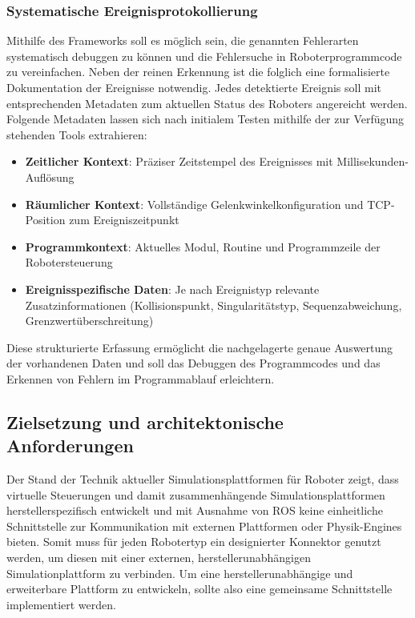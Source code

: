 \subsubsection{Systematische Ereignisprotokollierung}

Mithilfe des Frameworks soll es möglich sein, die genannten Fehlerarten
systematisch debuggen zu können und die Fehlersuche in Roboterprogrammcode zu
vereinfachen. Neben der reinen Erkennung ist die folglich eine formalisierte
Dokumentation der Ereignisse notwendig. Jedes detektierte Ereignis soll mit
entsprechenden Metadaten zum aktuellen Status des Roboters angereicht werden.
Folgende Metadaten lassen sich nach initialem Testen mithilfe der zur Verfügung
stehenden Tools extrahieren:

\begin{itemize}
  \item \textbf{Zeitlicher Kontext}: Präziser Zeitstempel des
    Ereignisses mit Millisekunden-Auflösung
  \item \textbf{Räumlicher Kontext}: Vollständige
    Gelenkwinkelkonfiguration und TCP-Position zum Ereigniszeitpunkt
  \item \textbf{Programmkontext}: Aktuelles Modul, Routine und
    Programmzeile der Robotersteuerung
  \item \textbf{Ereignisspezifische Daten}: Je nach Ereignistyp
    relevante Zusatzinformationen (Kollisionspunkt, Singularitätstyp,
    Sequenzabweichung, Grenzwertüberschreitung)
\end{itemize}

Diese strukturierte Erfassung ermöglicht die nachgelagerte genaue Auswertung der
vorhandenen Daten und soll das Debuggen des Programmcodes und das Erkennen von
Fehlern im Programmablauf erleichtern.

\subsection{Zielsetzung und architektonische Anforderungen}
Der Stand der Technik aktueller Simulationsplattformen für Roboter zeigt, dass
virtuelle Steuerungen und damit zusammenhängende Simulationsplattformen
herstellerspezifisch entwickelt und mit Ausnahme von ROS keine einheitliche
Schnittstelle zur Kommunikation mit externen Plattformen oder Physik-Engines
bieten. Somit muss für jeden Robotertyp ein designierter Konnektor genutzt
werden, um diesen mit einer externen, herstellerunabhängigen Simulationplattform
zu verbinden. Um eine herstellerunabhängige und erweiterbare Plattform zu
entwickeln, sollte also eine gemeinsame Schnittstelle implementiert werden.

